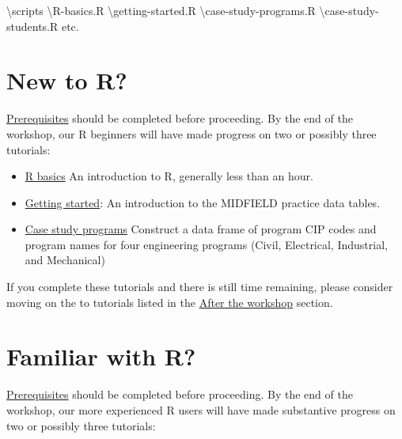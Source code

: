 \documentclass[
]{book}
\newenvironment{Shaded}{\begin{snugshade}}{\end{snugshade}}
\newcommand{\NormalTok}[1]{#1}
\newcommand{\SpecialCharTok}[1]{\textcolor[rgb]{0.00,0.00,0.00}{#1}}
\providecommand{\tightlist}{%
  \setlength{\itemsep}{0pt}\setlength{\parskip}{0pt}}
\begin{document}
\begin{Shaded}
\begin{Highlighting}[]
\NormalTok{        \textbackslash{}scripts    }
\NormalTok{            \textbackslash{}R}\SpecialCharTok{{-}}\NormalTok{basics.R    }
\NormalTok{            \textbackslash{}getting}\SpecialCharTok{{-}}\NormalTok{started.R    }
\NormalTok{            \textbackslash{}case}\SpecialCharTok{{-}}\NormalTok{study}\SpecialCharTok{{-}}\NormalTok{programs.R    }
\NormalTok{            \textbackslash{}case}\SpecialCharTok{{-}}\NormalTok{study}\SpecialCharTok{{-}}\NormalTok{students.R     }
\NormalTok{            etc.  }
\end{Highlighting}
\end{Shaded}

\hypertarget{new-to-r}{%
\section{New to R?}\label{new-to-r}}

\protect\hyperlink{prerequisites}{Prerequisites} should be completed before proceeding. By the end of the workshop, our R beginners will have made progress on two or possibly three tutorials:

\begin{itemize}
\tightlist
\item
  \protect\hyperlink{r-basics}{R basics} An introduction to R, generally less than an hour.
\item
  \href{https://midfieldr.github.io/midfieldr/articles/art-000-getting-started.html}{Getting started}: An introduction to the MIDFIELD practice data tables.
\item
  \href{https://midfieldr.github.io/midfieldr/articles/art-110-case-study-programs.html}{Case study programs} Construct a data frame of program CIP codes and program names for four engineering programs (Civil, Electrical, Industrial, and Mechanical)
\end{itemize}

If you complete these tutorials and there is still time remaining, please consider moving on the to tutorials listed in the \protect\hyperlink{after-the-workshop}{After the workshop} section.

\hypertarget{familiar-with-r}{%
\section{Familiar with R?}\label{familiar-with-r}}

\protect\hyperlink{prerequisites}{Prerequisites} should be completed before proceeding. By the end of the workshop, our more experienced R users will have made substantive progress on two or possibly three tutorials:
\end{document}
